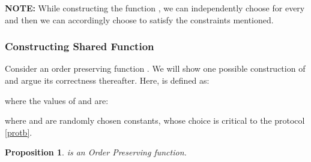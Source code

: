 \documentclass[11pt, letterpaper, romanappendices, onecolumn]{article}
\theoremstyle{plain}\newtheorem{thm}{Theorem}[section]
\newtheorem{prop}[thm]{Proposition}
\theoremstyle{definition}
\theoremstyle{remark}
\begin{document}
\par \textbf{NOTE:} While constructing the function , we can independently choose  for every  and then we can accordingly choose  to satisfy the constraints mentioned.

\subsubsection{Constructing Shared Function} \label{shared}
\par Consider an order preserving function . We will show one possible construction of  and argue its correctness thereafter.
Here,  is defined as:

\par where the values of  and  are:


\par \quad where  and  are randomly chosen constants, whose choice is critical to the protocol \ref{protb}.

\begin{prop}
 is an Order Preserving function.
\end{prop}
\end{document}

